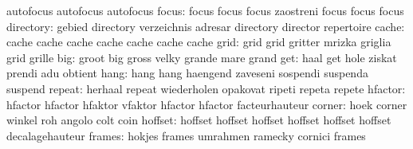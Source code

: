                            autofocus                 autofocus
                           autofocus
                    focus: focus                     focus
                           focus                     zaostreni
                           focus                     focus
                           focus
                directory: gebied                    directory
                           verzeichnis               adresar
                           directory                 director
                           repertoire
                    cache: cache                     cache
                           cache                     cache
                           cache                     cache
                           cache
                     grid: grid                      grid
                           gritter                   mrizka
                           griglia                   grid
                           grille
                      big: groot                     big
                           gross                     velky
                           grande                    mare
                           grand
                      get: haal                      get
                           hole                      ziskat
                           prendi                    adu
                           obtient
                     hang: hang                      hang
                           haengend                  zaveseni
                           sospendi                  suspenda
                           suspend
                   repeat: herhaal                   repeat
                           wiederholen               opakovat
                           ripeti                    repeta
                           repete
                  hfactor: hfactor                   hfactor
                           hfaktor                   vfaktor
                           hfactor                   hfactor
                           facteurhauteur
                   corner: hoek                      corner
                           winkel                    roh
                           angolo                    colt
                           coin
                  hoffset: hoffset                   hoffset
                           hoffset                   hoffset
                           hoffset                   hoffset
                           decalagehauteur
                   frames: hokjes                    frames
                           umrahmen                  ramecky
                           cornici                   frames
